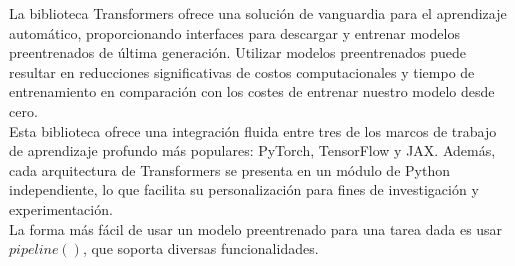 La biblioteca Transformers ofrece una solución de vanguardia para el aprendizaje automático, proporcionando interfaces para descargar y entrenar modelos preentrenados de última generación. Utilizar modelos preentrenados puede resultar en reducciones significativas de costos computacionales y tiempo de entrenamiento en comparación con los costes de entrenar nuestro modelo desde cero. \\

Esta biblioteca ofrece una integración fluida entre tres de los marcos de trabajo de aprendizaje profundo más populares: PyTorch, TensorFlow y JAX. Además, cada arquitectura de Transformers se presenta en un módulo de Python independiente, lo que facilita su personalización para fines de investigación y experimentación.\\

La forma más fácil de usar un modelo preentrenado para una tarea dada es usar $pipeline()$, que soporta diversas funcionalidades. \\


